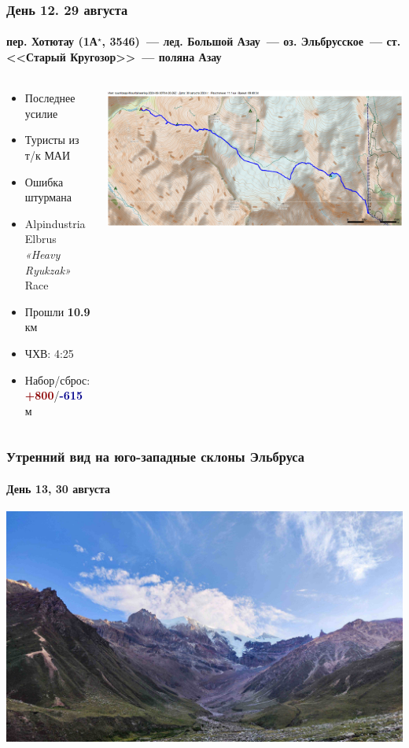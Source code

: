 \begin{frame}
	\frametitle{День 12. 29 августа}
	\framesubtitle{\textbf{пер. Хотютау (1А$^\star$, 3546)}~--- лед. Большой Азау~--- оз. Эльбрусское~--- ст. <<Старый Кругозор>>~--- поляна Азау} %
	\begin{columns}[c] %
		\begin{column}{0.55\textwidth} %
			\begin{itemize}
				\item Последнее усилие
				\item Туристы из т/к МАИ
				\item Ошибка штурмана
				\item Alpindustria Elbrus \textit{«Heavy Ryukzak»} Race
				\item Прошли \textbf{10.9} км
				\item ЧХВ: 4:25
				\item Набор/сброс: \textcolor{darkred}{\textbf{+800}}/\textcolor{darkblue}{\textbf{-615}}~м
			\end{itemize}			
		\end{column}
		\begin{column}{0.45\textwidth} %
			\centering
			\includegraphics[width=\linewidth]{../pics/mini_maps/30}
		\end{column}
	\end{columns}
\end{frame}


\begin{frame}
	\frametitle{Утренний вид на юго-западные склоны Эльбруса}
	\framesubtitle{День 13, 30 августа}	
	\centering
	\includegraphics[width=\textwidth]{../pics/IMG_20240830_063548}			
\end{frame}

